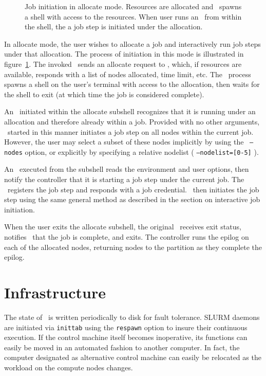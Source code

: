 \begin{figure}[tb]
\centerline{ }
\caption{\small Job initiation in allocate mode. Resources are allocated and
         \srun\ spawns a shell with access to the resources. When user runs 
	 an \srun\ from within the shell, the a job step is initiated under
	 the allocation.}
\label{init-allocate}
\end{figure}

In allocate mode, the user wishes to allocate a job and interactively run
job steps under that allocation. The process of initiation in this mode
is illustrated in figure~\ref{init-allocate}. The invoked \srun\ sends
an allocate request to \slurmctld , which, if resources are available,
responds with a list of nodes allocated, time limit, etc. The \srun\
process spawns a shell on the user's terminal with access to the
allocation, then waits for the shell to exit (at which time the job
is considered complete). 

An \srun\ initiated within the allocate subshell recognizes that it
is running under an allocation and therefore already within a job. Provided
with no other arguments, \srun\ started in this manner initiates a job
step on all nodes within the current job. However, the user may select
a subset of these nodes implicitly by using the \srun\ {\tt --nodes}  
option, or explicitly by specifying a relative nodelist 
( {\tt --nodelist=[0-5]} ). 

An \srun\ executed from the subshell reads the environment and
user options, then notify the controller that it is starting a job step
under the current job. The \slurmctld\ registers the job step and responds
with a job credential. \srun\ then initiates the job step using the same
general method as described in the section on interactive job initiation.

When the user exits the allocate subshell, the original \srun\ receives
exit status, notifies \slurmctld\ that the job is complete, and exits. 
The controller runs the epilog on each of the allocated nodes, returning
nodes to the partition as they complete the epilog.

\section{Infrastructure}

The state of \slurmctld\ is written periodically to disk for fault tolerance. 
SLURM daemons are initiated via {\tt inittab} using 
the {\tt respawn} option to insure their continuous execution. 
If the control machine itself becomes inoperative, its functions can
easily be moved in an automated fashion to another computer. In fact, the
computer designated as alternative control machine can easily be relocated as
the workload on the compute nodes changes. 

